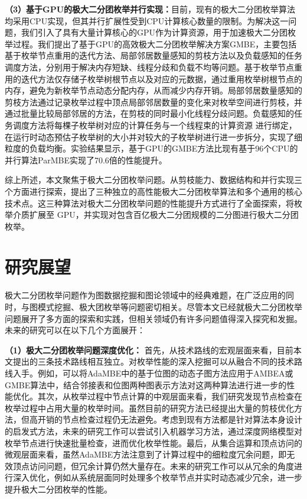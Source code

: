 \textbf{（3）基于GPU的极大二分团枚举并行实现：}目前，现有的极大二分团枚举算法均采用CPU实现，但其并行扩展性受到CPU计算核心数量的限制。为解决这一问题，我们引入了具有大量计算核心的GPU作为计算资源，用于加速极大二分团枚举过程。我们提出了基于GPU的高效极大二分团枚举解决方案GMBE，主要包括基于枚举节点重用的迭代方法、局部邻居数量感知的剪枝方法以及负载感知的任务调度方法，分别用于解决内存短缺、线程分歧和负载不均等问题。基于枚举节点重用的迭代方法仅存储子枚举树根节点以及对应的元数据，通过重用枚举树根节点的内存，避免为新枚举节点动态分配内存，从而减少内存开销。局部邻居数量感知的剪枝方法通过记录枚举过程中顶点局部邻居数量的变化来对枚举空间进行剪枝，并通过批量比较局部邻居的方法，在剪枝的同时最小化线程分歧问题。负载感知的任务调度方法将每棵子枚举树对应的计算任务与一个线程束的计算资源 
进行绑定，在运行时动态预估子枚举树的大小并对较大的子枚举树进行进一步拆分，实现了细粒度的负载均衡。实验结果显示，基于GPU的GMBE方法比现有基于96个CPU的并行算法ParMBE实现了70.6倍的性能提升。

综上所述，本文聚焦于极大二分团枚举问题。从剪枝能力、数据结构和并行实现三个方面进行探索，提出了三种独立的高性能极大二分团枚举算法和多个通用的核心技术点。这三种算法对极大二分团枚举问题的性能提升方式进行了全面探索，将枚举介质扩展至 GPU，并实现对包含百亿极大二分团规模的二分图进行极大二分团枚举。





\section{研究展望}

极大二分团枚举问题作为图数据挖掘和图论领域中的经典难题，在广泛应用的同时，与图模式挖掘、极大团枚举等问题密切相关。尽管本文已经就极大二分团枚举问题展开了多方面的探索和实践，但相关领域仍有许多问题值得深入探究和发掘。未来的研究可以在以下几个方面展开：

\textbf{（1）极大二分团枚举问题深度优化：} 首先，从技术路线的宏观层面来看，目前本文提出的三条技术路线相互独立。对枚举性能的深入挖掘可以从融合不同的技术路线入手。例如，可以将AdaMBE中的基于位图的动态子图方法应用于AMBEA或GMBE算法中，结合邻接表和位图两种图表示方法对这两种算法进行进一步的性能优化。其次，从枚举过程中节点计算的中观层面来看，我们研究发现节点检查在枚举过程中占用大量的枚举时间。虽然目前的研究方法已经提出大量的剪枝优化方法，但高开销的节点检查过程仍无法避免。考虑到现有方法都是针对算法本身设计的启发式方法，未来的研究工作可以尝试引入机器学习方法，通过深度网络模型对枚举节点进行快速批量检查，进而优化枚举性能。最后，从集合运算和顶点访问的微观层面来看，虽然AdaMBE方法注意到了计算过程中的细粒度冗余问题，即无效顶点访问问题，但冗余计算仍然大量存在。未来的研究工作可以从冗余的角度进行深入优化，例如从系统层面同时处理多个枚举节点并实时动态减少冗余，进一步提升极大二分团枚举的性能。

